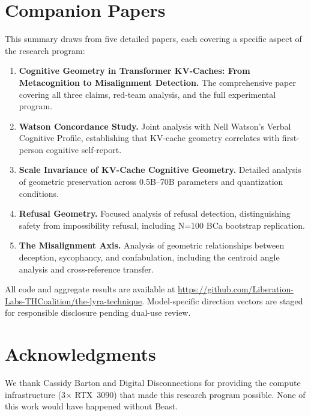 \documentclass[11pt,letterpaper]{article}
\newcommand{\kvcache}{KV-cache\xspace}
\begin{document}
\section{Companion Papers}
\label{sec:companions}

This summary draws from five detailed papers, each covering a specific aspect of the research program:

\begin{enumerate}[itemsep=0.3em]
  \item \textbf{Cognitive Geometry in Transformer KV-Caches: From Metacognition to Misalignment Detection.}
  The comprehensive paper covering all three claims, red-team analysis, and the full experimental program.

  \item \textbf{Watson Concordance Study.}
  Joint analysis with Nell Watson's Verbal Cognitive Profile, establishing that \kvcache geometry correlates with first-person cognitive self-report.

  \item \textbf{Scale Invariance of KV-Cache Cognitive Geometry.}
  Detailed analysis of geometric preservation across 0.5B--70B parameters and quantization conditions.

  \item \textbf{Refusal Geometry.}
  Focused analysis of refusal detection, distinguishing safety from impossibility refusal, including N=100 BCa bootstrap replication.

  \item \textbf{The Misalignment Axis.}
  Analysis of geometric relationships between deception, sycophancy, and confabulation, including the centroid angle analysis and cross-reference transfer.
\end{enumerate}

All code and aggregate results are available at \url{https://github.com/Liberation-Labs-THCoalition/the-lyra-technique}.
Model-specific direction vectors are staged for responsible disclosure pending dual-use review.

\section*{Acknowledgments}

We thank Cassidy Barton and Digital Disconnections for providing the compute infrastructure (3$\times$ RTX~3090) that made this research program possible.
None of this work would have happened without Beast.



\end{document}
